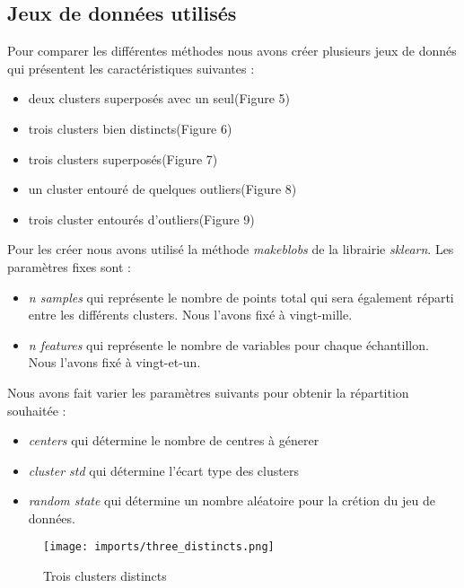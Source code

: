 \subsection{Jeux de données utilisés}
Pour comparer les différentes méthodes nous avons créer plusieurs jeux de donnés qui présentent les caractéristiques suivantes :
\begin{itemize}
    \item deux clusters superposés avec un seul(Figure 5)
    \item  trois clusters bien distincts(Figure 6)
    \item trois clusters superposés(Figure 7)
    \item un cluster entouré de quelques outliers(Figure 8)
    \item trois cluster entourés d’outliers(Figure 9)    
\end{itemize}
Pour les créer nous avons utilisé la méthode \textit{makeblobs} de la librairie \textit{sklearn}. Les paramètres fixes sont :
\begin{itemize}
    \item \textit{n samples} qui représente le nombre de points total qui sera également réparti entre les différents clusters. Nous l'avons fixé à vingt-mille.
    \item \textit{n features} qui représente le nombre de variables pour chaque échantillon. Nous l'avons fixé à vingt-et-un.
\end{itemize}
Nous avons fait varier les paramètres suivants pour obtenir la répartition souhaitée : 
\begin{itemize}
    \item \textit{centers} qui détermine le nombre de centres à génerer
    \item \textit{cluster std} qui détermine l'écart type des clusters
    \item \textit{random state} qui détermine un nombre aléatoire pour la crétion du jeu de données.
\end{itemize}


\begin{center}
    \begin{figure}[ht!]
        \centering
        
        \texttt{[image: imports/three\_distincts.png]}
        
        \caption{Trois clusters distincts}
    \end{figure}
\end{center}

